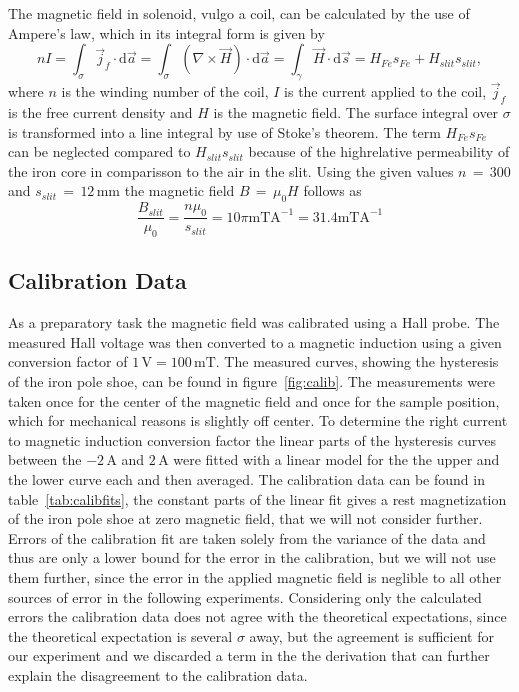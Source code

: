 \documentclass[a4paper,10pt]{scrartcl}
\begin{document}
The magnetic field in solenoid, vulgo a coil, can be calculated by the use of Ampere's law, which in its integral form is given by
\begin{equation}
nI = \int_\sigma \vec{j}_f \cdot \mbox{d}\vec{a} = \int_\sigma (\nabla \times \vec{H}) \cdot \mbox{d}\vec{a} = \int_\gamma \vec{H} \cdot \mbox{d}\vec{s} = H_{Fe}s_{Fe} + H_{slit}s_{slit},
\end{equation}
where $n$ is the winding number of the coil, $I$ is the current applied to the coil, $\vec{j}_f$ is the free current density and $H$ is the magnetic field. The surface integral over $\sigma$ is transformed into a line integral by use of Stoke's theorem. The term $H_{Fe}s_{Fe}$ can be neglected compared to $H_{slit}s_{slit}$ because of the highrelative permeability of the iron core in comparisson to the air in the slit. Using the given values $n\,=\,300$ and $s_{slit}\,=\,12\,$mm the magnetic field $B\,=\,\mu_0 H$ follows as
\begin{equation}
\frac{B_{slit}}{\mu_0} = \frac{n \mu_0}{s_{slit}} = 10 \pi \mbox{mTA}^{-1} = 31.4 \mbox{mTA}^{-1}
\end{equation}

\subsection{Calibration Data}

As a preparatory task the magnetic field was calibrated using a Hall probe. The measured Hall voltage was then converted to a magnetic induction using a given conversion factor of $1\,\mbox{V}=100\,\mbox{mT}$. The measured curves, showing the hysteresis of the iron pole shoe, can be found in figure~\ref{fig:calib}. The measurements were taken once for the center of the magnetic field and once for the sample position, which for mechanical reasons is slightly off center.
To determine the right current to magnetic induction conversion factor the linear parts of the hysteresis curves between the $-2\,$A and $2\,$A were fitted with a linear model for the the upper and the lower curve each and then averaged. The calibration data can be found in table~\ref{tab:calibfits}, the constant parts of the linear fit gives a rest magnetization of the iron pole shoe at zero magnetic field, that we will not  consider further. Errors of the calibration fit are taken solely from the variance of the data and thus are only a lower bound for the error in the calibration, but we will not use them further, since the error in the applied magnetic field is neglible to all other sources of error in the following experiments. Considering only the calculated errors the calibration data does not agree with the theoretical expectations, since the theoretical expectation is several $\sigma$ away, but the agreement is sufficient for our experiment and we discarded a term in the the derivation that can further explain the disagreement to the calibration data.
\end{document}
